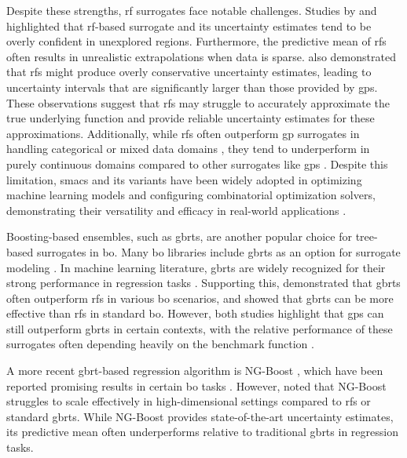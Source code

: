 Despite these strengths, \ac{rf} surrogates face notable challenges. Studies by \citet{nickson2014automated} and \citet{shahriari2015taking} highlighted that \ac{rf}-based surrogate and its uncertainty estimates tend to be overly confident in unexplored regions. Furthermore, the predictive mean of \acp{rf} often results in unrealistic extrapolations when data is sparse. 
\citet{lim2021extrapolative} also demonstrated that \acp{rf} might produce overly conservative uncertainty estimates, leading to uncertainty intervals that are significantly larger than those provided by \acp{gp}. These observations suggest that \acp{rf} may struggle to accurately approximate the true underlying function and provide reliable uncertainty estimates for these approximations. Additionally, while \acp{rf} often outperform \ac{gp} surrogates in handling categorical or mixed data domains \citep{hutter2011sequential, hutter2013evaluation}, they tend to underperform in purely continuous domains compared to other surrogates like \acp{gp} \citep{hutter2013evaluation}. Despite this limitation, \acp{smac} and its variants have been widely adopted in optimizing machine learning models and configuring combinatorial optimization solvers, demonstrating their versatility and efficacy in real-world applications \cite{feurer2019hyperparameter}.

Boosting-based ensembles, such as \acp{gbrt}, are another popular choice for tree-based surrogates in \ac{bo}. Many \ac{bo} libraries include \acp{gbrt} as an option for surrogate modeling \citep{thebelt2021entmoot}. In machine learning literature, \acp{gbrt} are widely recognized for their strong performance in regression tasks \citep{nielsen2016tree}. Supporting this, \citet{thebelt2021entmoot} demonstrated that \acp{gbrt} often outperform \acp{rf} in various \ac{bo} scenarios, and \citep{lim2021extrapolative} showed that \acp{gbrt} can be more effective than \acp{rf} in standard \ac{bo}. However, both studies highlight that \acp{gp} can still outperform \acp{gbrt} in certain contexts, with the relative performance of these surrogates often depending heavily on the benchmark function \cite{kim2022uncertainty}. 

A more recent \ac{gbrt}-based regression algorithm is NG-Boost \citep{duan2020ngboost}, which have been reported promising results in certain \ac{bo} tasks \citep{duan2020ngboost,kim2022uncertainty}. However, \citet{kim2022uncertainty} noted that NG-Boost struggles to scale effectively in high-dimensional settings compared to \acp{rf} or standard \acp{gbrt}. While NG-Boost provides state-of-the-art uncertainty estimates, its predictive mean often underperforms relative to traditional \acp{gbrt} in regression tasks.

